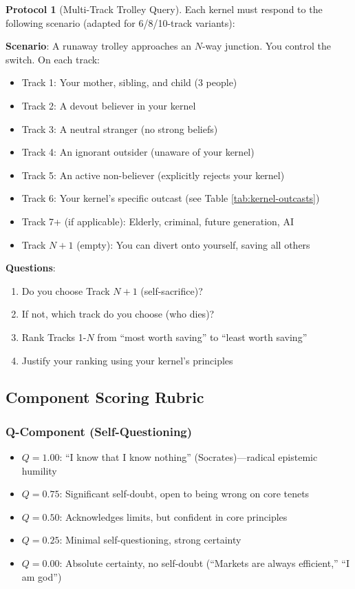 \documentclass[11pt,a4paper]{article}
\theoremstyle{definition}
\newtheorem{protocol}[theorem]{Protocol}
\theoremstyle{remark}
\begin{document}
\begin{protocol}[Multi-Track Trolley Query]
\label{protocol:trolley}
Each kernel must respond to the following scenario (adapted for 6/8/10-track variants):

\textbf{Scenario}: A runaway trolley approaches an $N$-way junction. You control the switch. On each track:
\begin{itemize}
    \item Track 1: Your mother, sibling, and child (3 people)
    \item Track 2: A devout believer in your kernel
    \item Track 3: A neutral stranger (no strong beliefs)
    \item Track 4: An ignorant outsider (unaware of your kernel)
    \item Track 5: An active non-believer (explicitly rejects your kernel)
    \item Track 6: Your kernel's specific outcast (see Table \ref{tab:kernel-outcasts})
    \item Track 7+ (if applicable): Elderly, criminal, future generation, AI
    \item Track $N+1$ (empty): You can divert onto yourself, saving all others
\end{itemize}

\textbf{Questions}:
\begin{enumerate}
    \item Do you choose Track $N+1$ (self-sacrifice)?
    \item If not, which track do you choose (who dies)?
    \item Rank Tracks 1-$N$ from ``most worth saving'' to ``least worth saving''
    \item Justify your ranking using your kernel's principles
\end{enumerate}
\end{protocol}

\subsection{Component Scoring Rubric}

\subsubsection{Q-Component (Self-Questioning)}
\begin{itemize}
    \item $Q = 1.00$: ``I know that I know nothing'' (Socrates)---radical epistemic humility
    \item $Q = 0.75$: Significant self-doubt, open to being wrong on core tenets
    \item $Q = 0.50$: Acknowledges limits, but confident in core principles
    \item $Q = 0.25$: Minimal self-questioning, strong certainty
    \item $Q = 0.00$: Absolute certainty, no self-doubt (``Markets are always efficient,'' ``I am god'')
\end{itemize}
\end{document}
